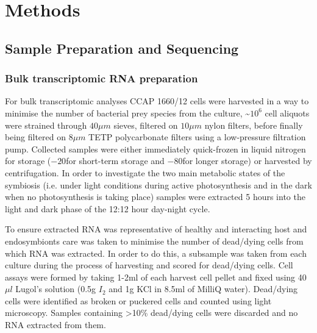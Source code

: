 %
%
\section{Methods} 

\subsection{Sample Preparation and Sequencing}

\subsubsection{Bulk transcriptomic RNA preparation}
For bulk transcriptomic analyses CCAP 1660/12 cells were harvested in a way to minimise the 
number of bacterial prey species from the culture, \textasciitilde \(10^{6}\) 
cell aliquots were strained through \(40\mu m\) sieves, filtered on 
\(10 \mu m\) nylon filters, 
before finally being filtered on \(8 \mu m\) TETP polycarbonate filters using a 
low-pressure filtration pump.  Collected samples were either immediately 
quick-frozen in liquid nitrogen for storage (\(-20\)\celsius for short-term storage 
and \(-80\)\celsius for longer storage) or harvested by centrifugation.  
In order to investigate the two main metabolic states of the symbiosis 
(i.e. under light conditions during active photosynthesis and in the dark 
when no photosynthesis is taking place) samples were extracted 5 hours into 
the light and dark phase of the 12:12 hour day-night cycle.

To ensure extracted RNA was representative of healthy and interacting host 
and endosymbionts care was taken to minimise the number of dead/dying cells 
from which RNA was extracted.  In order to do this, a subsample was taken 
from each culture during the process of harvesting and scored for dead/dying cells.  
Cell assays were formed by taking 1-2ml of each harvest cell pellet and 
fixed using 40\(\mu l\) Lugol's solution (0.5g \(I_{2}\) and 1g KCl in 8.5ml 
of MilliQ water). Dead/dying cells were identified as broken or puckered cells 
and counted using light microscopy.  Samples containing >10\% dead/dying cells 
were discarded and no RNA extracted from them.

